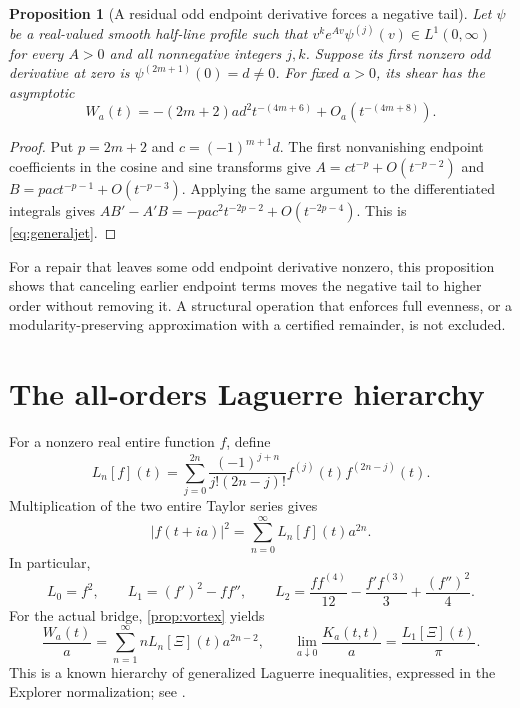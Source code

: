 \documentclass[11pt,letterpaper]{article}
\numberwithin{equation}{section}
\newtheorem{proposition}[theorem]{Proposition}
\theoremstyle{definition}
\theoremstyle{remark}
\begin{document}
\begin{proposition}[A residual odd endpoint derivative forces a negative tail]\label{prop:generaljet}
Let $\psi$ be a real-valued smooth half-line profile such that $v^k e^{Av}\psi^{(j)}(v)\in L^1(0,\infty)$ for every $A>0$ and all nonnegative integers $j,k$. Suppose its first nonzero odd derivative at zero is $\psi^{(2m+1)}(0)=d\ne0$. For fixed $a>0$, its shear has the asymptotic
\begin{equation}\label{eq:generaljet}
W_a(t)=-(2m+2)ad^2t^{-(4m+6)}+O_a(t^{-(4m+8)}).
\end{equation}
\end{proposition}
\begin{proof}
Put $p=2m+2$ and $c=(-1)^{m+1}d$. The first nonvanishing endpoint coefficients in the cosine and sine transforms give $A=c t^{-p}+O(t^{-p-2})$ and $B=pa c t^{-p-1}+O(t^{-p-3})$. Applying the same argument to the differentiated integrals gives $AB'-A'B=-pa c^2t^{-2p-2}+O(t^{-2p-4})$. This is \eqref{eq:generaljet}.
\end{proof}

For a repair that leaves some odd endpoint derivative nonzero, this proposition shows that canceling earlier endpoint terms moves the negative tail to higher order without removing it. A structural operation that enforces full evenness, or a modularity-preserving approximation with a certified remainder, is not excluded.

\section{The all-orders Laguerre hierarchy}\label{sec:Laguerre}
For a nonzero real entire function $f$, define
\begin{equation}\label{eq:Ln}
L_n[f](t)=\sum_{j=0}^{2n}
\frac{(-1)^{j+n}}{j!(2n-j)!}f^{(j)}(t)f^{(2n-j)}(t).
\end{equation}
Multiplication of the two entire Taylor series gives
\begin{equation}\label{eq:LaguerreSeries}
|f(t+ia)|^2=\sum_{n=0}^\infty L_n[f](t)a^{2n}.
\end{equation}
In particular,
\[
L_0=f^2,\qquad L_1=(f')^2-ff'',\qquad
L_2=\frac{ff^{(4)}}{12}-\frac{f'f^{(3)}}3+\frac{(f'')^2}{4}.
\]
For the actual bridge, \cref{prop:vortex} yields
\begin{equation}\label{eq:shearLaguerre}
\frac{W_a(t)}a=\sum_{n=1}^\infty nL_n[\Xi](t)a^{2n-2},\qquad
\lim_{a\downarrow0}\frac{K_a(t,t)}a=\frac{L_1[\Xi](t)}\pi.
\end{equation}
This is a known hierarchy of generalized Laguerre inequalities, expressed in the Explorer normalization; see \cite{cv,cardon}.
\end{document}
